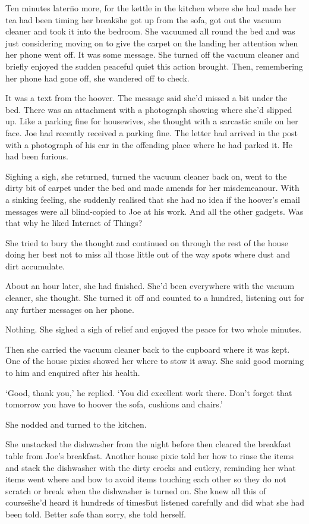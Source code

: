 Ten minutes later\=no more, for the kettle in the kitchen where she 
had made her tea had been timing her break\=she got up from the 
sofa, got out the vacuum cleaner and took it into the bedroom. She 
vacuumed all round the bed and was just considering moving on to 
give the carpet on the landing her attention when her phone went 
off. It was some message. She turned off the vacuum cleaner and 
briefly enjoyed the sudden peaceful quiet this action brought. 
Then, remembering her phone had gone off, she wandered off to 
check.

It was a text from the hoover. The message said she'd missed a bit 
under the bed. There was an attachment with a photograph showing 
where she'd slipped up. Like a parking fine for housewives, she 
thought with a sarcastic smile on her face. Joe had recently 
received a parking fine. The letter had arrived in the post with a 
photograph of his car in the offending place where he had parked 
it. He had been furious.

Sighing a sigh, she returned, turned the vacuum cleaner back on, 
went to the dirty bit of carpet under the bed and made amends for 
her misdemeanour. With a sinking feeling,
she suddenly realised that she had no idea if the hoover's
email messages were all blind-copied to Joe at his work. And
all the other gadgets. Was that why he liked Internet of Things?

She tried to bury the thought and continued on through the rest of 
the house doing her best not to miss all those little out of the 
way spots where dust and dirt accumulate.

About an hour later, she had finished. She'd been everywhere with 
the vacuum cleaner, she thought. She turned it off and counted to 
a hundred, listening out for any further messages on her phone.

Nothing. She sighed a sigh of relief and enjoyed the peace for two 
whole minutes.

Then she carried the vacuum cleaner back to the cupboard where it 
was kept. One of the house pixies showed her where to stow it away. She 
said good morning to him and enquired after his health.

`Good, thank you,' he replied. `You did excellent work there. 
Don't forget that tomorrow you have to hoover the sofa, cushions 
and chairs.'

She nodded and turned to the kitchen.

She unstacked the dishwasher from the night before then cleared the 
breakfast table from Joe's breakfast. Another house pixie told her how to 
rinse the items and stack the dishwasher with the dirty crocks 
and cutlery, reminding her what items went where and how to avoid 
items touching each other so they do not scratch or break when the 
dishwasher is turned on. She knew all this of course\=she'd heard 
it hundreds of times\=but listened carefully and did what she had 
been told. Better safe than sorry, she told herself.

